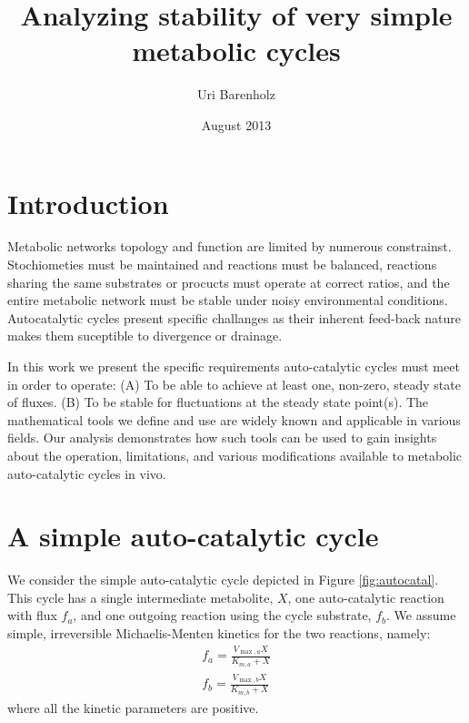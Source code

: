 \documentclass[a4page,notitlepage]{article}
\title{Analyzing stability of very simple metabolic cycles}
\author{Uri Barenholz}
\date{August 2013}
\begin{document}

\section{Introduction}
    Metabolic networks topology and function are limited by numerous constrainst.
    Stochiometies must be maintained and reactions must be balanced, reactions sharing the same substrates or procucts must operate at correct ratios, and the entire metabolic network must be stable under noisy environmental conditions.
    Autocatalytic cycles present specific challanges as their inherent feed-back nature makes them suceptible to divergence or drainage.

    In this work we present the specific requirements auto-catalytic cycles must meet in order to operate: (A) To be able to achieve at least one, non-zero, steady state of fluxes. (B) To be stable for fluctuations at the steady state point(s).
    The mathematical tools we define and use are widely known and applicable in various fields.
    Our analysis demonstrates how such tools can be used to gain insights about the operation, limitations, and various modifications available to metabolic auto-catalytic cycles in vivo.
\section{A simple auto-catalytic cycle}
    We consider the simple auto-catalytic cycle depicted in Figure \ref{fig:autocatal}.
    This cycle has a single intermediate metabolite, $X$, one auto-catalytic reaction with flux $f_a$, and one outgoing reaction using the cycle substrate, $f_b$.
    We assume simple, irreversible Michaelis-Menten kinetics for the two reactions, namely:
    \begin{eqnarray*}
      f_a = \frac{V_{\max,a}X}{K_{m,a}+X} \\
      f_b = \frac{V_{\max,b}X}{K_{m,b}+X}
    \end{eqnarray*}
    where all the kinetic parameters are positive.
\end{document}
